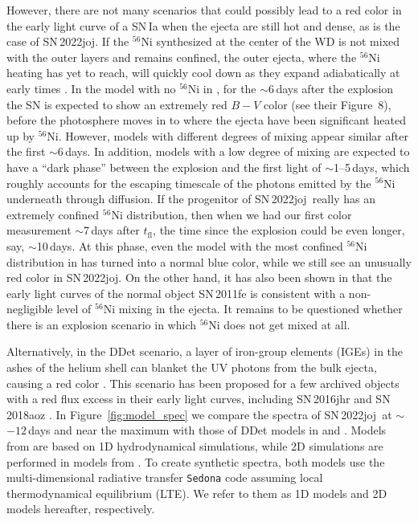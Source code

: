 \documentclass[twocolumn]{aastex631}
\newcommand{\sn}{SN\,2022joj}
\newcommand{\tfl}{$t_\mathrm{fl}$}
\begin{document}
\begin{CJK*}{UTF8}{gbsn}
However, there are not many scenarios that could possibly lead to a red color in the early light curve of a SN\,Ia when the ejecta are still hot and dense, as is the case of \sn. If the $^{56}$Ni synthesized at the center of the WD is not mixed with the outer layers and remains confined, the outer ejecta, where the $^{56}$Ni heating has yet to reach, will quickly cool down as they expand adiabatically at early times \citep{Piro_2016}. In the model with no $^{56}$Ni in \citet{Piro_2016}, for the $\sim$6\,days after the explosion the SN is expected to show an extremely red $B-V$ color (see their Figure~8), before the photosphere moves in to where the ejecta have been significant heated up by $^{56}$Ni. However, models with different degrees of mixing appear similar after the first $\sim$6\,days. In addition, models with a low degree of mixing are expected to have a ``dark phase'' \citep{Piro_2013} between the explosion and the first light of $\sim$1--5\,days, which roughly accounts for the escaping timescale of the photons emitted by the $^{56}$Ni underneath through diffusion. If the progenitor of \sn\ really has an extremely confined $^{56}$Ni distribution, then when we had our first color measurement $\sim$7\,days after \tfl, the time since the explosion could be even longer, say, $\sim$10\,days. At this phase, even the model with the most confined $^{56}$Ni distribution in \citet{Piro_2016} has turned into a normal blue color, while we still see an unusually red color in \sn. On the other hand, it has also been shown in \citet{Piro_2016} that the early light curves of the normal object SN\,2011fe is consistent with a non-negligible level of $^{56}$Ni mixing in the ejecta. It remains to be questioned whether there is an explosion scenario in which $^{56}$Ni does not get mixed at all.

Alternatively, in the DDet scenario, a layer of iron-group elements (IGEs) in the ashes of the helium shell can blanket the UV photons from the bulk ejecta, causing a red color \citep{polin_observational_2019}. This scenario has been proposed for a few archived objects with a red flux excess in their early light curves, including SN\,2016jhr \citep{jiang_16jhr_2017} and SN\,2018aoz \citep{Ni_2022}. In Figure~\ref{fig:model_spec} we compare the spectra of \sn\ at $\sim$$-12$\,days and near the maximum with those of DDet models in \citet{polin_observational_2019} and \citet{Shen_2D_2021}. Models from \citet{polin_observational_2019} are based on 1D hydrodynamical simulations, while 2D simulations are performed in models from \citet{Shen_2D_2021}. To create synthetic spectra, both models use the multi-dimensional radiative transfer \texttt{Sedona} code assuming local thermodynamical equilibrium (LTE). We refer to them as 1D models and 2D models hereafter, respectively. 


\end{CJK*}
\end{document}

